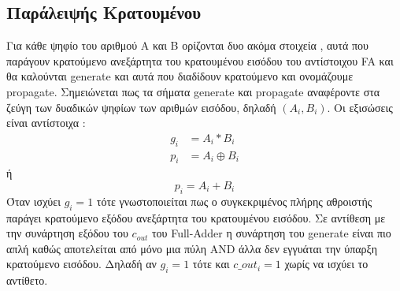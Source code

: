 \subsection{Παράλειψής Κρατουμένου}
Για κάθε ψηφίο του αριθμού Α και Β ορίζονται δυο ακόμα στοιχεία , αυτά που παράγουν κρατούμενο ανεξάρτητα του κρατουμένου εισόδου του αντίστοιχου FA και θα καλούνται generate και αυτά που διαδίδουν κρατούμενο και ονομάζουμε propagate. Σημειώνεται πως τα σήματα generate και propagate αναφέροντε στα ζεύγη των δυαδικών ψηφίων των αριθμών εισόδου, δηλαδή $(A_i,B_i)$. Οι εξισώσεις είναι αντίστοιχα :
\begin{equation}
\begin{split}
    g_i &= A_i * B_i  \\
    p_i &= A_i \oplus B_i 
\end{split}
\end{equation}
ή
\begin{equation*}
    p_i = A_i + B_i
\end{equation*}
Όταν ισχύει $g_i=1$ τότε γνωστοποιείται πως ο συγκεκριμένος πλήρης αθροιστής παράγει κρατούμενο εξόδου ανεξάρτητα του κρατουμένου εισόδου. Σε αντίθεση με την συνάρτηση εξόδου του $c_{out}$ του Full-Adder η συνάρτηση του generate είναι πιο απλή καθώς αποτελείται από μόνο μια πύλη AND άλλα δεν εγγυάται την ύπαρξη κρατούμενο εισόδου. Δηλαδή αν $g_i=1$ τότε και $c\_out_i=1$ χωρίς να ισχύει το αντίθετο. 

